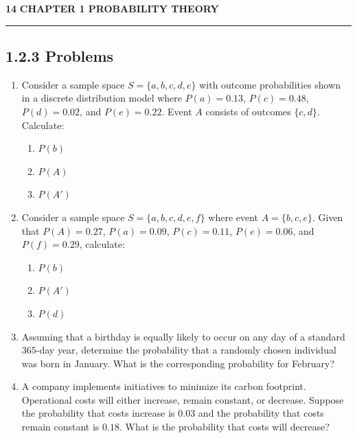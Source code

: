 \documentclass[10pt, twocolumn]{article}
\begin{document}
\vspace{1em}
\noindent\textbf{14} \hfill {\color{myblue}\small\textbf{CHAPTER 1 \quad PROBABILITY THEORY}}
\vspace{1em}


{\color{myblue}\rule{\linewidth}{1.5pt}}
\subsection*{1.2.3 \quad Problems}

\begin{enumerate}[label=\textbf{1.2.\arabic*}]

    \item Consider a sample space $S = \{a, b, c, d, e\}$ with outcome probabilities shown in a discrete distribution model where $P(a) = 0.13$, $P(c) = 0.48$, $P(d) = 0.02$, and $P(e) = 0.22$. Event $A$ consists of outcomes $\{c, d\}$. Calculate:
    \begin{enumerate}[label=\textbf{(\alph*)}]
        \item $P(b)$
        \item $P(A)$
        \item $P(A')$
    \end{enumerate}

    \item Consider a sample space $S = \{a, b, c, d, e, f\}$ where event $A = \{b, c, e\}$. Given that $P(A) = 0.27$, $P(a) = 0.09$, $P(c) = 0.11$, $P(e) = 0.06$, and $P(f) = 0.29$, calculate:
    \begin{enumerate}[label=\textbf{(\alph*)}]
        \item $P(b)$
        \item $P(A')$
        \item $P(d)$
    \end{enumerate}

    \item Assuming that a birthday is equally likely to occur on any day of a standard $365$-day year, determine the probability that a randomly chosen individual was born in January. What is the corresponding probability for February?

    \item A company implements initiatives to minimize its carbon footprint. Operational costs will either increase, remain constant, or decrease. Suppose the probability that costs increase is $0.03$ and the probability that costs remain constant is $0.18$. What is the probability that costs will decrease?


\end{enumerate}
\end{document}
